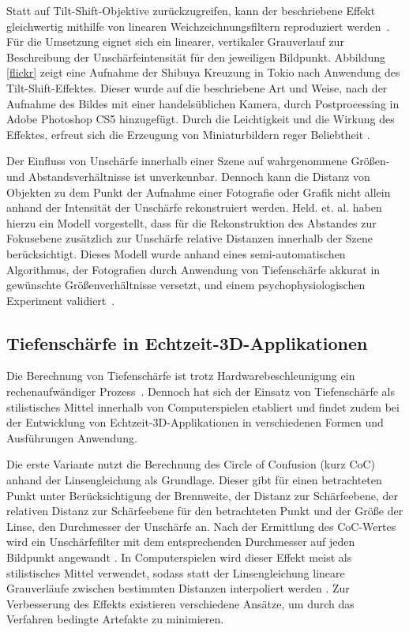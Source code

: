 \documentclass{acmsiggraph}                     %
\begin{document}
Statt auf Tilt-Shift-Objektive zurückzugreifen, kann der beschriebene Effekt gleichwertig mithilfe von linearen Weichzeichnungsfiltern reproduziert werden~\cite{McCloskey:2009ij}. Für die Umsetzung eignet sich ein linearer, vertikaler Grauverlauf zur Beschreibung der Unschärfeintensität für den jeweiligen Bildpunkt. Abbildung \ref{flickr} zeigt eine Aufnahme der Shibuya Kreuzung in Tokio nach Anwendung des Tilt-Shift-Effektes. Dieser wurde auf die beschriebene Art und Weise, nach der Aufnahme des Bildes mit einer handelsüblichen Kamera, durch Postprocessing in Adobe Photoshop CS5 hinzugefügt. Durch die Leichtigkeit und die Wirkung des Effektes, erfreut sich die Erzeugung von Miniaturbildern reger Beliebtheit \cite{Flickr:2011hc}.

Der Einfluss von Unschärfe innerhalb einer Szene auf wahrgenommene Größen- und Abstandsverhältnisse ist unverkennbar. Dennoch kann die Distanz von Objekten zu dem Punkt der Aufnahme einer Fotografie oder Grafik nicht allein anhand der Intensität der Unschärfe rekonstruiert werden. Held. et. al. haben hierzu ein Modell vorgestellt, dass für die Rekonstruktion des Abstandes zur Fokusebene zusätzlich zur Unschärfe relative Distanzen innerhalb der Szene berücksichtigt. Dieses Modell wurde anhand eines semi-automatischen Algorithmus, der Fotografien durch Anwendung von Tiefenschärfe akkurat in gewünschte Größenverhältnisse versetzt, und einem psychophysiologischen Experiment validiert~\cite{Held:2010cr}.

\subsection{Tiefenschärfe in Echtzeit-3D-Applikationen}
Die Berechnung von Tiefenschärfe ist trotz Hardwarebeschleunigung ein rechenaufwändiger Prozess~\cite{Held:2010cr}. Dennoch hat sich der Einsatz von Tiefenschärfe als stilistisches Mittel innerhalb von Computerspielen etabliert und findet zudem bei der Entwicklung von Echtzeit-3D-Applikationen in verschiedenen Formen und Ausführungen Anwendung.

Die erste Variante nutzt die Berechnung des Circle of Confusion (kurz CoC) anhand der Linsengleichung als Grundlage. Dieser gibt für einen betrachteten Punkt unter Berücksichtigung der Brennweite, der Distanz zur Schärfeebene, der relativen Distanz zur Schärfeebene für den betrachteten Punkt und der Größe der Linse, den Durchmesser der Unschärfe an. Nach der Ermittlung des CoC-Wertes wird ein Unschärfefilter mit dem entsprechenden Durchmesser auf jeden Bildpunkt angewandt \cite{Dudash:2004ul,Scheuermann:2004wd}. In Computerspielen wird dieser Effekt meist als stilistisches Mittel verwendet, sodass statt der Linsengleichung lineare Grauverläufe zwischen bestimmten Distanzen interpoliert werden \cite{Earll-Hammon:2007qf,Filion:2008ve}. Zur Verbesserung des Effekts existieren verschiedene Ansätze, um durch das Verfahren bedingte Artefakte zu minimieren.
\end{document}
